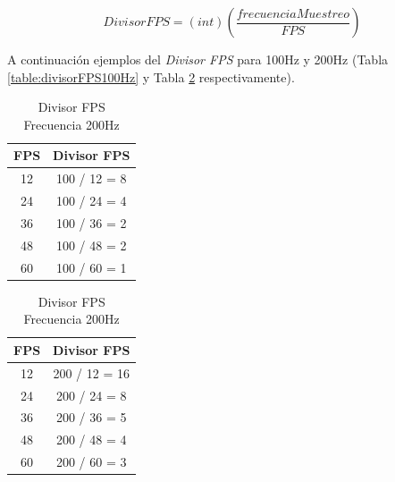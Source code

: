 \documentclass[12pt,a4paper]{article}
\begin{document}
\begin{equation}
\label{eq:divisorFPS}
DivisorFPS=(int)\left(\frac{frecuenciaMuestreo}{FPS}\right)
\end{equation}

A continuación ejemplos del \textit{Divisor FPS} para 100Hz y 200Hz (Tabla \ref{table:divisorFPS100Hz} y Tabla \ref{table:divisorFPS200Hz} respectivamente).

\begin{table}[!htb]
	\begin{minipage}{.5\linewidth}
		\centering
			\begin{tabular}{|c|c|}
				\hline
				\textbf{FPS} & \multicolumn{1}{l|}{\textbf{Divisor FPS}} \\ \hline
				12           & 100 / 12 = 8                                         \\ \hline
				24           & 100 / 24 = 4                                         \\ \hline
				36           & 100 / 36 = 2                                         \\ \hline
				48           & 100 / 48 = 2                                         \\ \hline
				60           & 100 / 60 = 1                                         \\ \hline
			\end{tabular}
			\caption{Divisor FPS Frecuencia 100Hz}
			\label{table:divisorFPS100Hz}
	\end{minipage}%
	\begin{minipage}{.5\linewidth}
		\centering
		\begin{tabular}{|c|c|}
			\hline
			\textbf{FPS} & \multicolumn{1}{l|}{\textbf{Divisor FPS}} \\ \hline
				12           & 200 / 12 = 16                             \\ \hline
				24           & 200 / 24 = 8                              \\ \hline
				36           & 200 / 36 = 5                              \\ \hline
				48           & 200 / 48 = 4                              \\ \hline
				60           & 200 / 60 = 3                              \\ \hline
		\end{tabular}
		\caption{Divisor FPS Frecuencia 200Hz}
		\label{table:divisorFPS200Hz}
	\end{minipage}
\end{table}
\end{document}
